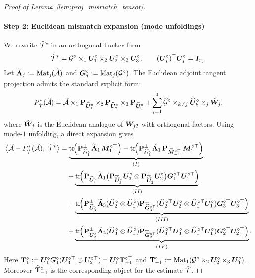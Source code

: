 \documentclass[authoryear,preprint,review,12pt]{elsarticle}
\begin{document}
{\begin{proof}[Proof of Lemma~\ref{lem:proj_mismatch_tensor}]
		\paragraph{Step 2: Euclidean mismatch expansion (mode unfoldings)}
		We rewrite $\check{\mathcal{T}}^\ast$ in an orthogonal Tucker form
		\[
		\check{\mathcal{T}}^\ast=\mathcal G^\circ\times_1\boldsymbol U_1^\circ\times_2\boldsymbol U_2^\circ\times_3\boldsymbol U_3^\circ,
		\qquad (\boldsymbol U_j^\circ)^\top\boldsymbol U_j^\circ=\boldsymbol I_{r_j}.
		\]
		Let $\widetilde{\mathbf{A}}_j:=\mathrm{Mat}_j(\widetilde{\mathcal{A}})$ and $\boldsymbol G_j^\circ:=\mathrm{Mat}_j(\mathcal G^\circ)$.
		The Euclidean adjoint tangent projection admits the standard explicit form:
		\[
		P_{\check{\mathcal{T}}}^\ast(\widetilde{\mathcal{A}})
		=
		\widetilde{\mathcal{A}}\times_1\mathbf{P}_{\widehat{\boldsymbol U}_1^\circ}\times_2\mathbf{P}_{\widehat{\boldsymbol U}_2^\circ}\times_3\mathbf{P}_{\widehat{\boldsymbol U}_3^\circ}
		+\sum_{j=1}^3 \widehat{\mathcal G}^\circ\times_{k\neq j}\widehat{\boldsymbol U}_k^\circ\times_j \check{\boldsymbol W}_j,
		\]
		where $\check{\boldsymbol W}_j$ is the Euclidean analogue of $\boldsymbol W_{j2}$ with orthogonal factors.
		Using mode-$1$ unfolding,
		a direct expansion gives
		\begin{align}
			\big\langle \widetilde{\mA}-P_{\check{\mT}}^\ast(\widetilde{\mA}),\ \check{\mT}^\ast\big\rangle
			&=
			\underbrace{\mathrm{tr}\!\Big(\bP_{\widehat{\bU}_1^\circ}^{\perp}\widetilde{\bA}_1\,\bM_1^{\circ\top}\Big)
				-\mathrm{tr}\!\Big(\bP_{\widehat{\bU}_1^\circ}^{\perp}\widetilde{\bA}_1\,\bP_{\widehat{\bM}_{-1}^{\circ\top}}\,\bM_1^{\circ\top}\Big)}_{(I)}
			\label{eq:I_def}
			\\
			&\quad+
			\underbrace{\mathrm{tr}\!\Big(\bP_{\widehat{\bU}_1^\circ}\widetilde{\bA}_1\big(\bP_{\widehat{\bU}_3^\circ}^{\perp}\bU_3^\circ\otimes
				\bP_{\widehat{\bU}_2^\circ}^{\perp}\bU_2^\circ\big)\bG_1^{\circ\top}\bU_1^{\circ\top}\Big)}_{(II)}
			\label{eq:II_def}
			\\
			&\quad+
			\underbrace{\mathrm{tr}\!\Big(
				\bP_{\widehat{\bU}_3^\circ}^{\perp}\widetilde{\bA}_3(\widehat{\bU}_2^\circ\otimes \widehat{\bU}_1^\circ)
				\bP_{\widehat{\bG}_3^{\circ\top}}^{\perp}(\widehat{\bU}_2^{\circ\top}\bU_2^\circ\otimes \widehat{\bU}_1^{\circ\top}\bU_1^\circ)
				\bG_3^{\circ\top}\bU_3^{\circ\top}
				\Big)}_{(III)}
			\label{eq:III_def}
			\\
			&\quad+
			\underbrace{\mathrm{tr}\!\Big(
				\bP_{\widehat{\bU}_2^\circ}^{\perp}\widetilde{\bA}_2(\widehat{\bU}_3^\circ\otimes \widehat{\bU}_1^\circ)
				\bP_{\widehat{\bG}_2^{\circ\top}}^{\perp}(\widehat{\bU}_3^{\circ\top}\bU_3^\circ\otimes \widehat{\bU}_1^{\circ\top}\bU_1^\circ)
				\bG_2^{\circ\top}\bU_2^{\circ\top}
				\Big)}_{(IV)}.
			\label{eq:IV_def}
		\end{align}
		Here $\mathbf{T}_1^\circ:=\boldsymbol U_1^\circ\boldsymbol G_1^\circ(\boldsymbol U_3^{\circ\top}\otimes\boldsymbol U_2^{\circ\top})=\boldsymbol U_1^\circ\mathbf{T}_{-1}^{\circ\top}$ and
		$\mathbf{T}_{-1}^\circ:=\mathrm{Mat}_1(\mathcal G^\circ\times_2\boldsymbol U_2^\circ\times_3\boldsymbol U_3^\circ)$.
		Moreover $\widehat{\mathbf{T}}_{-1}^\circ$ is the corresponding object for the estimate $\check{\mathcal{T}}$.
		

\end{proof}}
\end{document}
